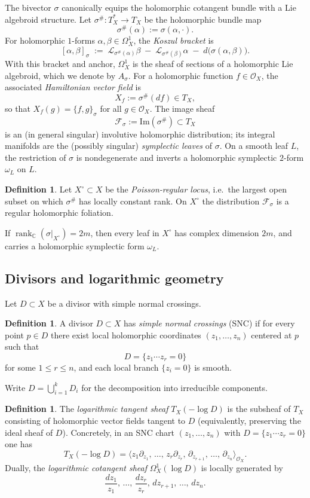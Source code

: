 \documentclass[11pt]{amsart}
\theoremstyle{plain}
\theoremstyle{definition}
\newtheorem{definition}[theorem]{Definition}
\theoremstyle{definition}
\newcommand{\C}{\mathbb{C}}
\newcommand{\OO}{\mathcal{O}}
\newcommand{\im}{\mathrm{Im}}
\begin{document}
The bivector $\sigma$ canonically equips the holomorphic cotangent bundle with a Lie algebroid structure.
Let $\sigma^\#:T_X^*\to T_X$ be the holomorphic bundle map
$$
\sigma^\#(\alpha) := \sigma(\alpha,\cdot).
$$
For holomorphic $1$-forms $\alpha,\beta\in\Omega_X^1$, the \emph{Koszul bracket} is
$$
[\alpha,\beta]_\sigma \;:=\;
\mathcal{L}_{\sigma^\#(\alpha)}\beta \;-\; \mathcal{L}_{\sigma^\#(\beta)}\alpha \;-\; d\big(\sigma(\alpha,\beta)\big).
$$
With this bracket and anchor, $\Omega_X^1$ is the sheaf of sections of a holomorphic Lie algebroid,
which we denote by $A_\sigma$.
For a holomorphic function $f\in\OO_X$, the associated \emph{Hamiltonian vector field} is
$$
X_f := \sigma^\#(df)\in T_X,
$$
so that $X_f(g)=\{f,g\}_\sigma$ for all $g\in\OO_X$.
The image sheaf
$$
\mathcal{F}_\sigma := \im(\sigma^\#)\subset T_X
$$
is an (in general singular) involutive holomorphic distribution; its integral manifolds are the
(possibly singular) \emph{symplectic leaves} of $\sigma$. On a smooth leaf $L$, the restriction of $\sigma$
is nondegenerate and inverts a holomorphic symplectic $2$-form $\omega_L$ on $L$.

\begin{definition}\label{def:regular-locus}
Let $X^\circ\subset X$ be the \emph{Poisson-regular locus}, i.e.\ the largest open subset on which
$\sigma^\#$ has locally constant rank. On $X^\circ$ the distribution $\mathcal{F}_\sigma$ is a regular
holomorphic foliation.
\end{definition}
If $\operatorname{rank}_\C(\sigma|_{X^\circ})=2m$, then every leaf in $X^\circ$ has complex dimension $2m$,
and carries a holomorphic symplectic form $\omega_L$.

\subsection{Divisors and logarithmic geometry}

Let $D\subset X$ be a divisor with simple normal crossings.
\begin{definition}\label{def:snc}
A divisor $D \subset X$ has \emph{simple normal crossings} (SNC) if for every point $p\in D$ there exist
local holomorphic coordinates $(z_1,\dots,z_n)$ centered at $p$ such that
$$
D = \{z_1\cdots z_r = 0\}
$$
for some $1\le r\le n$, and each local branch $\{z_i=0\}$ is smooth.
\end{definition}
Write $D=\bigcup_{i=1}^k D_i$ for the decomposition into irreducible components.

\begin{definition}\label{def:logTB}
The \emph{logarithmic tangent sheaf} $T_X(-\log D)$ is the subsheaf of $T_X$ consisting of holomorphic vector
fields tangent to $D$ (equivalently, preserving the ideal sheaf of $D$). Concretely, in an SNC chart
$(z_1,\dots,z_n)$ with $D=\{z_1\cdots z_r=0\}$ one has
$$
T_X(-\log D)
=
\big\langle
z_1\partial_{z_1},\,
\dots,\,
z_r\partial_{z_r},\,
\partial_{z_{r+1}},\,
\dots,\,
\partial_{z_n}
\big\rangle_{\OO_X}.
$$
Dually, the \emph{logarithmic cotangent sheaf} $\Omega^1_X(\log D)$ is locally generated by
$$
\frac{dz_1}{z_1},\,
\dots,\,
\frac{dz_r}{z_r},\,
dz_{r+1},\,
\dots,\,
dz_n.
$$
\end{definition}
\end{document}
